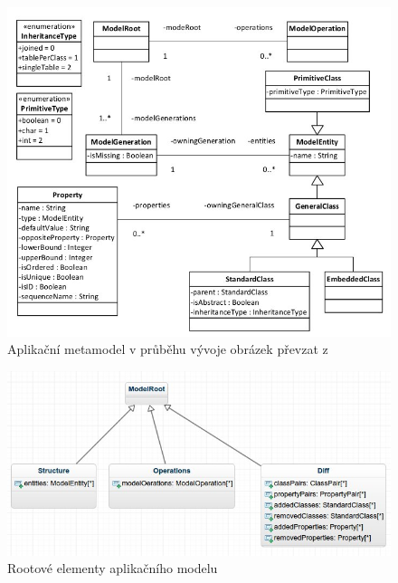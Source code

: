 \documentclass[11pt,twoside,a4paper]{book}
\begin{document}
\begin{figure}[ht]
\begin{center}
\includegraphics[width=15cm]{figures/app_meta_BP_jezek}
\caption{Aplikační metamodel v průběhu vývoje obrázek převzat z \cite{Jezek}}
\label{fig:jezek:app_meta}
\end{center}
\end{figure}

\begin{figure}[ht]
\begin{center}
\includegraphics[width=15cm]{figures/app_roots}
\caption{Rootové elementy aplikačního modelu}
\label{fig:app_roots}
\end{center}
\end{figure}
\end{document}
